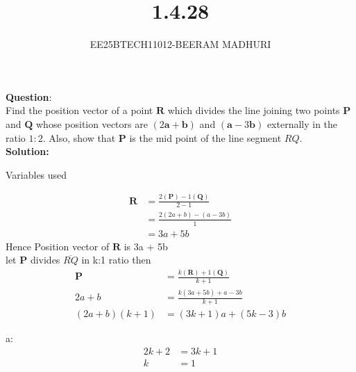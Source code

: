 \documentclass[journal]{IEEEtran}
\begin{document}

\vspace{3cm}

\title{1.4.28}
\author{EE25BTECH11012-BEERAM MADHURI}
{\let\newpage\relax\maketitle}

\renewcommand{\thefigure}{\theenumi}
\renewcommand{\thetable}{\theenumi}
\setlength{\intextsep}{10pt} %


\renewcommand{\thetable}{\theenumi}


\textbf{Question}:\\
Find the position vector of a point $\mathbf{R}$ which divides the line joining two points $\mathbf{P}$ and $\mathbf{Q}$ whose position vectors are $(2\mathbf{a} + \mathbf{b})$ and $(\mathbf{a} - 3\mathbf{b})$ externally in the ratio $1 : 2$. Also, show that $\mathbf{P}$ is the mid point of the line segment $RQ$.
\\
\textbf{Solution: }
\begin{table}[h!]
    \centering
    
    \caption{Variables used}
    \label{table 1.4.28}
\end{table}

\begin{align*}
 \textbf{R} &= \frac{2(\textbf{P}) - 1(\textbf{Q})}{2 - 1} \\
&= \frac{2(2a+b) - (a-3b)}{1} \\
&= 3a + 5b
\end{align*}
Hence Position vector of $\mathbf{R}$ is 3a + 5b\\
let $\mathbf{P}$ divides $\overline{RQ}$ in k:1 ratio
then 
\begin{align*}
\mathbf{P} &= \frac{k(\textbf{R}) + 1(\textbf{Q})}{k+1} \\
2a+b &= \frac{k(3a+5b) + a-3b}{k+1} \\
(2a+b)(k+1) &= (3k+1)a + (5k-3)b
\end{align*}

 a:
\begin{align*}
2k+2 &= 3k+1 \\
k &= 1
\end{align*}
\end{document}
